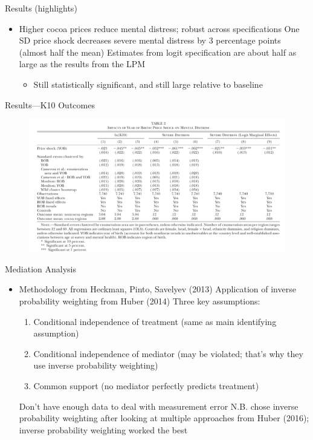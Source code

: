 \documentclass[dvipsnames]{beamer}
\begin{document}
    \begin{frame}{Results (highlights)}
      \begin{itemize}
      \item Higher cocoa prices reduce mental distress; robust across specifications
        \vitem One SD price shock decreases severe mental distress by 3 percentage points (almost half the mean)
        \vitem Estimates from logit specification are about half as large as the results from the LPM
        \begin{itemize}
        \item Still statistically significant, and still large relative to baseline
        \end{itemize}
      \end{itemize}
    \end{frame}
    \begin{frame}{Results---K10 Outcomes}
      \begin{figure}[htp]
        \centering
      \includegraphics[width=\textwidth, keepaspectratio=true]{tab2.png}  
      \end{figure}
    \end{frame}
    \begin{frame}{Mediation Analysis}
      \begin{itemize}
      \item Methodology from Heckman, Pinto, Savelyev (2013)
        \vitem Application of inverse probability weighting from Huber (2014)
        \vitem Three key assumptions:
        \begin{enumerate}
        \item Conditional independence of treatment (same as main identifying assumption)
        \item Conditional independence of mediator (may be violated; that's why they use inverse probability weighting)
          \item Common support (no mediator perfectly predicts treatment)
        \end{enumerate}
        \vitem Don't have enough data to deal with measurement error
        \vitem N.B. chose inverse probability weighting after looking at multiple approaches from Huber (2016); inverse probability weighting worked the best
      \end{itemize}
    \end{frame}
\end{document}
